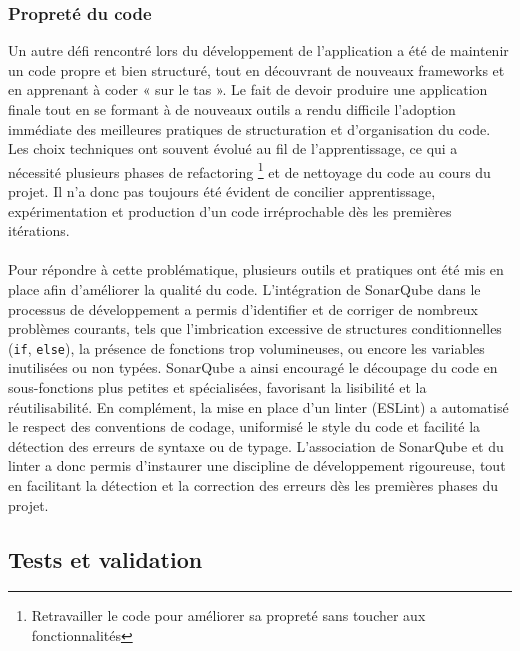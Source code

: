 \documentclass[12pt]{article}
\begin{document}
\subsubsection{Propreté du code}
Un autre défi rencontré lors du développement de l’application a été de maintenir un code propre et bien structuré, tout en découvrant de nouveaux frameworks et en apprenant à coder « sur le tas ». Le fait de devoir produire une application finale tout en se formant à de nouveaux outils a rendu difficile l’adoption immédiate des meilleures pratiques de structuration et d’organisation du code. Les choix techniques ont souvent évolué au fil de l’apprentissage, ce qui a nécessité plusieurs phases de refactoring \footnote{Retravailler le code pour améliorer sa propreté sans toucher aux fonctionnalités} et de nettoyage du code au cours du projet. Il n’a donc pas toujours été évident de concilier apprentissage, expérimentation et production d’un code irréprochable dès les premières itérations.
\\\\
Pour répondre à cette problématique, plusieurs outils et pratiques ont été mis en place afin d’améliorer la qualité du code. L’intégration de SonarQube dans le processus de développement a permis d’identifier et de corriger de nombreux problèmes courants, tels que l’imbrication excessive de structures conditionnelles (\texttt{if}, \texttt{else}), la présence de fonctions trop volumineuses, ou encore les variables inutilisées ou non typées. SonarQube a ainsi encouragé le découpage du code en sous-fonctions plus petites et spécialisées, favorisant la lisibilité et la réutilisabilité. En complément, la mise en place d’un linter (ESLint) a automatisé le respect des conventions de codage, uniformisé le style du code et facilité la détection des erreurs de syntaxe ou de typage. L’association de SonarQube et du linter a donc permis d’instaurer une discipline de développement rigoureuse, tout en facilitant la détection et la correction des erreurs dès les premières phases du projet.

\subsection{Tests et validation}
\end{document}
